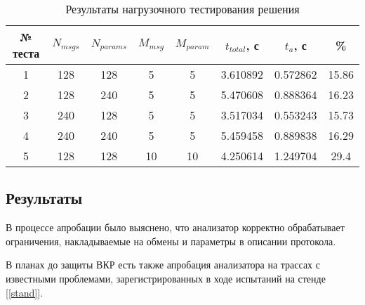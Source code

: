 \begin{table}[H]
 \centering
 \begin{tabular}{|c|*{7}{c|}}
  \hline
  № теста & $N_{msgs}$ & $N_{params}$ & $M_{msg}$ & $M_{param}$ & $t_{total}$, 
с & $t_{a}$, с & \% \\
  \hline
  1 & 128 & 128 & 5   & 5   & 3.610892 & 0.572862 & 15.86 \\
  2 & 128 & 240 & 5   & 5   & 5.470608 & 0.888364 & 16.23 \\
  3 & 240 & 128 & 5   & 5   & 3.517034 & 0.553243 & 15.73 \\
  4 & 240 & 240 & 5   & 5   & 5.459458 & 0.889838 & 16.29 \\
  5 & 128 & 128 & 10 & 10 & 4.250614 & 1.249704 & 29.4 \\
  \hline
 \end{tabular}
 \caption{Результаты нагрузочного тестирования решения}
 \label{tab:prof}
\end{table}

\subsection{Результаты}

В процессе апробации было выяснено, что анализатор корректно обрабатывает 
ограничения, накладываемые на обмены и параметры в описании протокола.

В планах до защиты ВКР есть также апробация анализатора на трассах с 
известными проблемами, зарегистрированных в ходе испытаний на стенде 
[\ref{stand}].